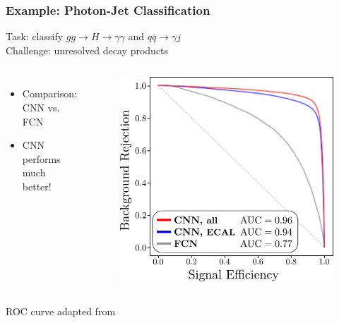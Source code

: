 \documentclass[14pt, t]{beamer}
\begin{document}
\begin{frame}
    \frametitle{Example: Photon-Jet Classification}

    Task: classify $ gg \to H \to \gamma \gamma $ and $ q \bar{q} \to \gamma j $\\
    Challenge: unresolved decay products
    \vspace{-5mm}
    \begin{columns}

        \begin{itemize}
    
            \item Comparison: CNN vs. FCN

            \item CNN performs much better!

        \end{itemize}


        \begin{figure}[htb!]
            \centering
            \includegraphics[width=\columnwidth]{raster/raster-svg/roc.pdf}
        \end{figure}

    \end{columns}

    \vfill
    {\tiny ROC curve adapted from \cite{andrews-higgs}}

\end{frame}
\end{document}

